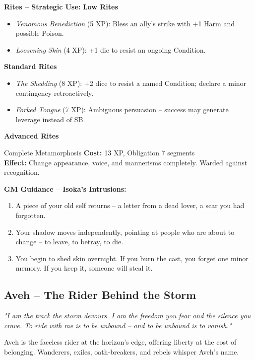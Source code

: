 \documentclass[10pt,a5paper]{book}
\begin{document}
\textbf{Rites -- Strategic Use:}
\textbf{Low Rites}
\begin{itemize}
    \item \textit{Venomous Benediction} (5 XP): Bless an ally's strike with +1 Harm and possible Poison.
    \item \textit{Loosening Skin} (4 XP): +1 die to resist an ongoing Condition.
\end{itemize}
\textbf{Standard Rites}
\begin{itemize}
    \item \textit{The Shedding} (8 XP): +2 dice to resist a named Condition; declare a minor contingency retroactively.
    \item \textit{Forked Tongue} (7 XP): Ambiguous persuasion -- success may generate leverage instead of SB.
\end{itemize}
\textbf{Advanced Rites}
\begin{patronbox}{Complete Metamorphosis}
\textbf{Cost:} 13 XP, Obligation 7 segments \\
\textbf{Effect:} Change appearance, voice, and mannerisms completely. Warded against recognition.
\end{patronbox}

\textbf{GM Guidance -- Isoka's Intrusions:}
\begin{enumerate}
    \item A piece of your old self returns -- a letter from a dead lover, a scar you had forgotten.
    \item Your shadow moves independently, pointing at people who are about to change -- to leave, to betray, to die.
    \item You begin to shed skin overnight. If you burn the cast, you forget one minor memory. If you keep it, someone will steal it.
\end{enumerate}

\clearpage

\subsection{Aveh -- The Rider Behind the Storm}
\label{patron:aveh}

\textit{"I am the track the storm devours. I am the freedom you fear and the silence you crave. To ride with me is to be unbound -- and to be unbound is to vanish."}

Aveh is the faceless rider at the horizon's edge, offering liberty at the cost of belonging. Wanderers, exiles, oath‑breakers, and rebels whisper Aveh's name.
\end{document}
